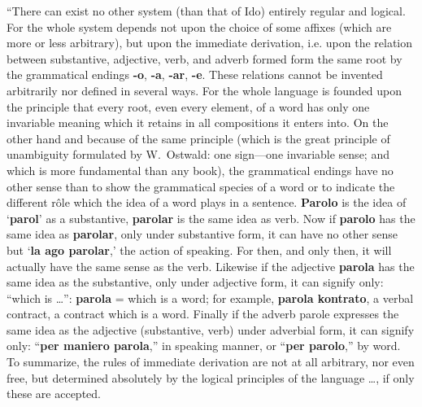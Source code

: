 ``There can exist no other system (than that of Ido) entirely regular and logical. For the whole system depends not upon the choice of some affixes (which are more or less arbitrary), but upon the immediate derivation, i.e. upon the relation between substantive, adjective, verb, and adverb formed form the same root by the grammatical endings \textbf{-o}, \textbf{-a}, \textbf{-ar}, \textbf{-e}. These relations cannot be invented arbitrarily nor defined in several ways. For the whole language is founded upon the principle that every root, even every element, of a word has only one invariable meaning which it retains in all compositions it enters into. On the other hand and because of the same principle (which is the great principle of unambiguity formulated by W.~Ostwald: one sign—one invariable sense; and which is more fundamental than any book), the grammatical endings have no other sense than to show the grammatical species of a word or to indicate the different rôle which the idea of a word plays in a sentence. \textbf{Parolo} is the idea of `\textbf{parol}' as a substantive, \textbf{parolar} is the same idea as verb. Now if \textbf{parolo} has the same idea as \textbf{parolar}, only under substantive form, it can have no other sense but `\textbf{la ago parolar},' the action of speaking. For then, and only then, it will actually have the same sense as the verb. Likewise if the adjective \textbf{parola} has the same idea as the substantive, only under adjective form, it can signify only: ``which is \ldots'': \textbf{parola} = which is a word; for example, \textbf{parola kontrato}, a verbal contract, a contract which is a word. Finally if the adverb parole expresses the same idea as the adjective (substantive, verb) under adverbial form, it can signify only: ``\textbf{per maniero parola},'' in speaking manner, or ``\textbf{per parolo},'' by word. To summarize, the rules of immediate derivation are not at all arbitrary, nor even free, but determined absolutely by the logical principles of the language \ldots, if only these are accepted.

